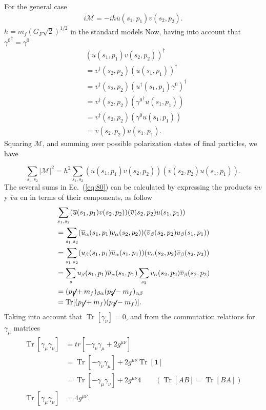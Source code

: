 For the general case
\begin{align}
i\mathcal{M}=-i h\overline{u}(s_1,p_{1})v(s_2, p_{2}). 
\end{align}
$h=m_{f}\left(G_{F}\sqrt{2}\right)^{1/2}$ in the standard models
Now, having into account that ${\gamma^{0}}^{\dag}=\gamma^{0}$
\begin{align*}
&(\overline{u}(s_1,p_{1})v(s_2, p_{2}))^{\dag}\\
&=v^{\dag}(s_2, p_{2})(\overline{u}(s_1,p_{1}))^{\dag}\\
&=v^{\dag}(s_2, p_{2})({u^{\dag}}(s_1,p_{1}){\gamma^{0}})^{\dag}\\
&=v^{\dag}(s_2, p_{2})({\gamma^{0}}^{\dag}u(s_1,p_{1}))\\
&=v^{\dag}(s_2, p_{2})(\gamma^{0}u(s_1,p_{1}))\\
&=\overline{v}(s_2,p_{2})u(s_1,p_{1}). 
\end{align*}
Squaring  $\mathcal{M}$,  and summing over possible polarization states of final particles, we have

\begin{equation}
\sum_{s_1,s_2}|\mathcal{M}|^{2}=h^2\sum_{s_1,s_2}(\overline{u}(s_1,p_{1})v(s_2,
p_{2}))(\overline{v}(s_2,p_{2})u(s_1,p_{1})). \label{eq:80}
\end{equation}
The several sums in Ec.~(\ref{eq:80}) can be calculated by expressing the products  $\overline{u}v$ y $\overline{v}u$ en in terms of their components, as follow
\begin{align}
\label{eq:81}
&\sum_{s_1,s_2}(\overline{u}(s_1,p_{1})v(s_2, p_{2}))(\overline{v}(s_2,p_{2})u(s_1,p_{1}))\nonumber\\
&=\sum_{s_1,s_2}(\overline{u}_{\alpha}(s_1,p_{1})v_{\alpha}(s_2, p_{2}))(\overline{v}_{\beta}(s_2,p_{2})u_{\beta}(s_1,p_{1}))\nonumber\\
&=\sum_{s_1,s_2}(u_{\beta}(s_1,p_{1})\overline{u}_{\alpha}(s_1,p_{1}))(v_{\alpha}(s_2, p_{2})\overline{v}_{\beta}(s_2,p_{2}))\nonumber\\
&=\sum_{s}u_{\beta}(s_1,p_{1})\overline{u}_{\alpha}(s_1,p_{1})\sum_{s_2}v_{\alpha}(s_2, p_{2})\overline{v}_{\beta}(s_2,p_{2})\nonumber\\
&=(\cancel{p}_{1}+m_{f})_{\beta\alpha}(\cancel{p}_{2}-m_{f})_{\alpha\beta}\nonumber\\
&=\operatorname{Tr}[(\cancel{p}_{1}+m_{f})(\cancel{p}_{2}-m_{f})]. 
\end{align}
Taking into account that  $\operatorname{Tr}[\gamma_{\nu}]=0$, and from the commutation relations for $\gamma_\mu$ matrices
\begin{align*}
\operatorname{Tr}[\gamma_{\mu}\gamma_{\nu}]&=tr[-\gamma_{\nu}\gamma_{\mu}+2g^{\mu\nu}]\\
&=\operatorname{Tr}[-\gamma_{\nu}\gamma_{\mu}]+2g^{\mu\nu}\operatorname{Tr}[\mathbf{1}]\\
&=\operatorname{Tr}[-\gamma_{\mu}\gamma_{\nu}]+2g^{\mu\nu}4 \qquad (\operatorname{Tr}[AB]=\operatorname{Tr}[BA])\\
\operatorname{Tr}[\gamma_{\mu}\gamma_{\nu}]&=4g^{\mu\nu}.
\end{align*}

